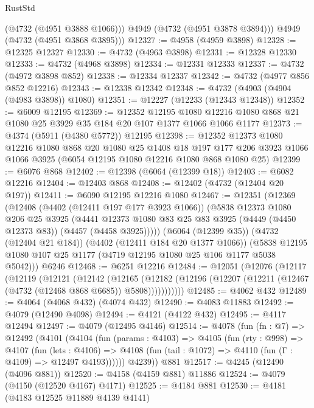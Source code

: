 \begin{lexlean}{RustStd}
\begin{coremodule}
          (@4732 (@4951 @3888 @1066)))
        @4949
        (@4732 (@4951 @3878 @3894)))
      @4949
      (@4732 (@4951 @3868 @3895)))
@12327 := @4958 (@4959 @3898)
@12328 := @12325 @12327
@12330 := @4732 (@4963 @3898)
@12331 := @12328 @12330
@12333 := @4732 (@4968 @3898)
@12334 := @12331 @12333
@12337 := @4732 (@4972 @3898 @852)
@12338 := @12334 @12337
@12342 := @4732 (@4977 @856 @852 @12216)
@12343 := @12338 @12342
@12348 := @4732 (@4903 (@4904 (@4983 @3898)) @1080)
@12351 := @12227 (@12233 (@12343 @12348))
@12352 := @6009 @12195
@12369 := @12352
    @12195
    @1080
    @12216
    @1080
    @868
    @21
    @1080
    @25
    @3929
    @35
    @184
    @20
    @107
    @1377
    @1066
    @1066
    @1177
@12373 := @4374 (@5911 (@4380 @5772)) @12195
@12398 := @12352
    @12373
    @1080
    @12216
    @1080
    @868
    @20
    @1080
    @25
    @1408
    @18
    @197
    @177
    @206
    @3923
    @1066
    @1066
    @3925
    (@6054 @12195 @1080 @12216 @1080 @868 @1080 @25)
@12399 := @6076 @868
@12402 := @12398 (@6064 (@12399 @18))
@12403 := @6082 @12216
@12404 := @12403 @868
@12408 := @12402 (@4732 (@12404 @20 @197))
@12411 := @6090 @12195 @12216 @1080
@12467 := @12351
    (@12369
      (@12408
        (@4402 (@12411 @197 @177 @3923 @1066))
        (@5838
          @12373
          @1080
          @206
          @25
          @3925
          (@4441 @12373 @1080 @83 @25 @83 @3925 (@4449 (@4450 @12373 @83)) (@4457 (@4458 @3925)))))
      (@6064 (@12399 @35))
      (@4732 (@12404 @21 @184))
      (@4402 (@12411 @184 @20 @1377 @1066))
      (@5838 @12195 @1080 @107 @25 @1177 (@4719 @12195 @1080 @25 @106 @1177 @5038 @5042)))
    @6246
@12468 := @6251 @12216
@12484 := @12051
    (@12076
      (@12117
        (@12119
          (@12121
            (@12142
              (@12165
                (@12182 (@12196 (@12207 (@12211 (@12467 (@4732 (@12468 @868 @6685)) @5808)))))))))))
@12485 := @4062 @432
@12489 := @4064 (@4068 @432) (@4074 @432)
@12490 := @4083 @11883
@12492 := @4079 (@12490 @4098)
@12494 := @4121 (@4122 @432)
@12495 := @4117 @12494
@12497 := @4079 (@12495 @4146)
@12514 := @4078
    (fun (fn : @7) =>
    @12492
      (@4101
        (@4104
          (fun (params : @4103) =>
          @4105
            (fun (rty : @998) =>
            @4107
              (fun (lets : @4106) =>
              @4108 (fun (tail : @1072) => @4110 (fun (Γ : @4109) => @12497 @4193))))))
        @4239))
    @881
@12517 := @4245 (@12490 (@4096 @881))
@12520 := @4158 (@4159 @881) @11886
@12524 := @4079 (@4150 (@12520 @4167) @4171)
@12525 := @4184 @881
@12530 := @4181 (@4183 @12525 @11889 @4139 @4141)

\end{coremodule}
\end{lexlean}
